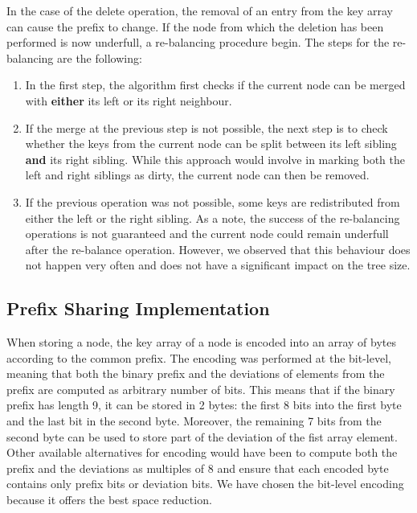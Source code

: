 \documentclass[11pt,a4paper,oneside]{article}
\begin{document}
In the case of the delete operation, the removal of an entry from the key array can cause the prefix to change. If the node from which the deletion has been performed is now underfull, a re-balancing procedure begin. The steps for the re-balancing are the following:
\begin{enumerate}
	\item In the first step, the algorithm first checks if the current node can be merged with \textbf{either} its left or its right neighbour. 
	\item If the merge at the previous step is not possible, the next step is to check whether the keys from the current node can be split between its left sibling \textbf{and} its right sibling. While this approach would involve in marking both the left and right siblings as dirty, the current node can then be removed.
	\item If the previous operation was not possible, some keys are redistributed from either the left or the right sibling. As a note, the success of the re-balancing operations is not guaranteed and the current node could remain underfull after the re-balance operation. However, we observed that this behaviour does not happen very often and does not have a significant impact on the tree size.
\end{enumerate}


\subsection{Prefix Sharing Implementation} %
\label{sub:prefix_sharing_rebalancing}
When storing a node, the key array of a node is encoded into an array of bytes according to the common prefix. The encoding was performed at the bit-level, meaning that both the binary prefix and the deviations of elements from the prefix are computed as arbitrary number of bits. This means that if the binary prefix has length 9, it can be stored in 2 bytes: the first 8 bits into the first byte and the last bit in the second byte. Moreover, the remaining 7 bits from the second byte can be used to store part of the deviation of the fist array element. Other available alternatives for encoding would have been to compute both the prefix and the deviations as multiples of 8 and ensure that each encoded byte contains only prefix bits or deviation bits. We have chosen the bit-level encoding because it offers the best space reduction.
\end{document}
